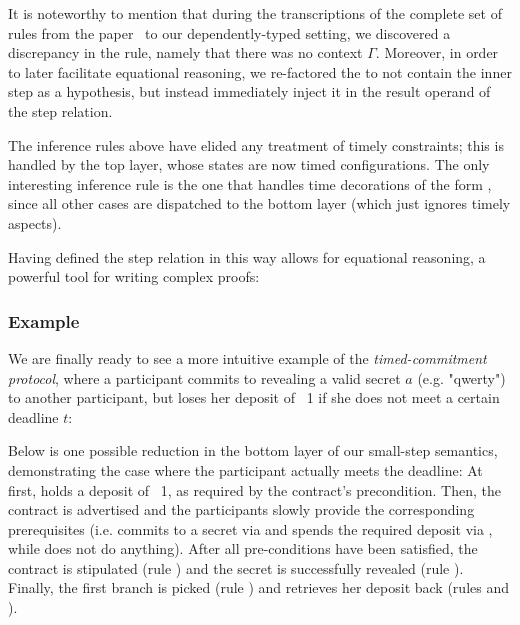 \documentclass[acmsmall,nonacm=true,screen=true]{acmart}
\begin{document}
It is noteworthy to mention that during the transcriptions of the complete set of rules from the paper~\cite{bitml}
to our dependently-typed setting,
we discovered a discrepancy in the \inlineAuthRevRule{} rule, namely that there was no context $\Gamma$.
Moreover, in order to later facilitate equational reasoning, we re-factored the \inlineControlRule{}
to not contain the inner step as a hypothesis, but instead immediately inject it in the result operand of the step relation.

The inference rules above have elided any treatment of timely constraints;
this is handled by the top layer, whose states are now timed configurations.
The only interesting inference rule is the one that handles time decorations of the form \inlineAfter{},
since all other cases are dispatched to the bottom layer (which just ignores timely aspects).
\BITtimedRules{}

Having defined the step relation in this way allows for equational reasoning, a powerful tool for
writing complex proofs:
\BITeqReasoning{}

\subsubsection{Example}
We are finally ready to see a more intuitive example of the \textit{timed-commitment protocol}, where a participant
commits to revealing a valid secret $a$ (e.g. "qwerty") to another participant,
but loses her deposit of \bitcoin ~1 if she does not meet a certain deadline $t$:
\BITexampleA{}

Below is one possible reduction in the bottom layer of our small-step semantics, demonstrating the case where
the participant actually meets the deadline:
\BITexampleB{}
At first, \inlineA{} holds a deposit of \bitcoin ~1, as required by the contract's precondition.
Then, the contract is advertised and the participants slowly provide the corresponding prerequisites
(i.e. \inlineA{} commits to a secret via \inlineAuthCommitRule{} and spends the required deposit via \inlineAuthInitRule{},
while \inlineB{} does not do anything).
After all pre-conditions have been satisfied, the contract is stipulated (rule \inlineInitRule{}) and the secret is successfully
revealed (rule \inlineAuthRevRule{}).
Finally, the first branch is picked (rule \inlineControlRule{}) and \inlineA{} retrieves her deposit back
(rules \inlinePutRevRule{} and \inlineWithdrawRule{}).
\end{document}
